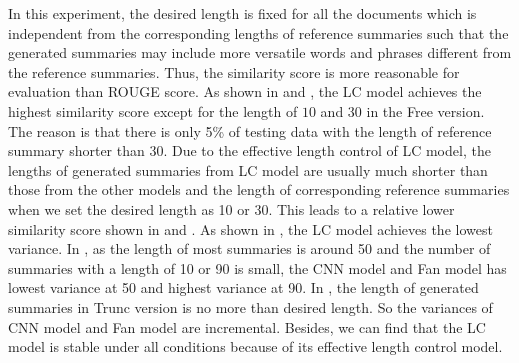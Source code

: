 In this experiment, 
the desired length is fixed for all the documents which is independent from 
the corresponding lengths of reference summaries
such that the generated summaries may include more versatile 
words and phrases different from the reference summaries.
Thus, the similarity score is more reasonable for evaluation than 
ROUGE score.
As shown in  and , 
the LC model achieves the highest similarity score
except for the length of $10$ and $30$ in the Free version.
The reason is that there is only 5\% of testing data with the length of reference summary shorter 
than 30. 
Due to the effective length control of LC model,
the lengths of generated summaries from LC model are 
usually much shorter than those from the other models and 
the length of corresponding reference summaries
when we set the desired length as 10 or 30.
This leads to a relative lower similarity score shown in
 and .
As shown in , the LC model achieves the lowest
variance. 
In , as the length of most summaries is around
50 and the number of summaries with a length of 10 or 90 
is small, the CNN model and Fan model has lowest variance at 
50 and highest variance at 90.
In , the length of generated summaries in 
Trunc version is no more than desired length. So the variances
of CNN model and Fan model are incremental.
Besides, we can find that the LC model is stable under all 
conditions because of its effective length control model. 


